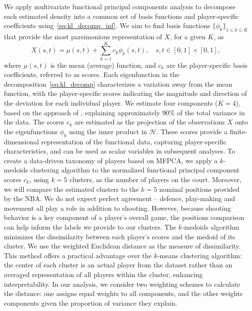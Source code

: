We apply multivariate functional principal components analysis  \citep{happMultivariateFunctionalPrincipal2018} to decompose each estimated density into a common set of basis functions and player-specific coefficients using~\eqref{eq:kl_decomp_inf}.
We aim to find basis functions $\{\phi_k\}_{1 \leq k \leq K}$ that provide the most parsimonious representation of $X$, for a given $K$, as
\begin{equation}\label{eq:kl_decomp}
	X(s, t) = \mu(s, t) + \sum_{k = 1}^K c_k\phi_k(s, t), \quad s, t \in [0, 1] \times [0, 1],
\end{equation}
where $\mu(s, t)$ is the mean (average) function, and $c_k$ are the player-specific basis coefficients, referred to as scores. Each eigenfunction in the decomposition~\eqref{eq:kl_decomp} characterizes a variation away from the mean function, with the player-specific scores indicating the magnitude and direction of the deviation for each individual player. We estimate four components ($K = 4$), based on the approach of \cite{golovkineUseGramMatrix2024}, explaining approximately $90\%$ of the total variance in the data. The scores $c_k$ are estimated as the projection of the observations $X$ onto the eigenfunctions $\phi_k$ using the inner product in $\mathcal{H}$. These scores provide a finite-dimensional representation of the functional data, capturing player-specific characteristics, and can be used as scalar variables in subsequent analyses.
To create a data-driven taxonomy of players based on MFPCA, we apply a $k$-medoids clustering algorithm \citep{kaufmanFindingGroupsData2009} to the normalized functional principal component scores $c_k$, using $k = 5$ clusters, as the number of players on the court.
	Moreover, we will compare the estimated clusters to the $k=5$ nominal positions provided by the NBA.
		We do not expect perfect agreement -- defence, play-making and movement all play a role in addition to shooting.
		However, because shooting behavior is a key component of a player's overall game, the positions comparison can help inform the labels we provide to our clusters.
The $k$-medoids algorithm minimizes the dissimilarity between each player's scores and the medoid of its cluster. We use the weighted Euclidean distance as the measure of dissimilarity. This method offers a practical advantage over the $k$-means clustering algorithm: the center of each cluster is an actual player from the dataset rather than an averaged representation of all players within the cluster, enhancing interpretability. In our analysis, we consider two weighting schemes to calculate the distance: one assigns equal weights to all components, and the other weights components given the proportion of variance they explain.

